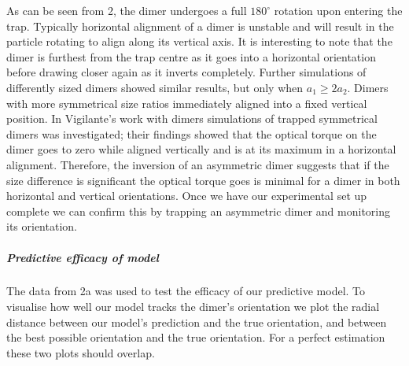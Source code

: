 \documentclass[11pt]{article}
\begin{document}
	As can be seen from \figurename{ 2}, the dimer undergoes a full $180^{\circ}$ rotation upon entering the trap. Typically horizontal alignment of a dimer is unstable and will result in the particle rotating to align along its vertical axis. It is interesting to note that the dimer is furthest from the trap centre as it goes into a horizontal orientation before drawing closer again as it inverts completely. Further simulations of differently sized dimers showed similar results, but only when $a_1 \geq 2a_2$. Dimers with more symmetrical size ratios immediately aligned into a fixed vertical position. 
	In Vigilante's work with dimers \cite{Brownian_OT} simulations of trapped symmetrical dimers was investigated; their findings showed that the optical torque on the dimer goes to zero while aligned vertically and is at its maximum in a horizontal alignment. Therefore, the inversion of an asymmetric dimer suggests that if the size difference is significant the optical torque goes is minimal for a dimer in both horizontal and vertical orientations. Once we have our experimental set up complete we can confirm this by trapping an asymmetric dimer and monitoring its orientation. 
	
	\subparagraph*{Predictive efficacy of model}
	The data from \figurename{ 2a} was used to test the efficacy of our predictive model. To visualise how well our model tracks the dimer's orientation we plot the radial distance between our model's prediction and the true orientation, and between the best possible orientation and the true orientation. For a perfect estimation these two plots should overlap. 
	
\end{document}
